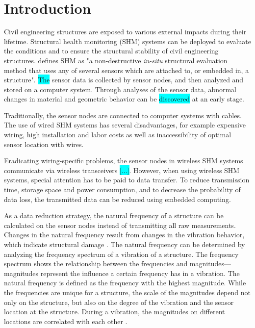 \documentclass[12pt,a4paper]{scrartcl}
\begin{document}
\section*{Introduction}

Civil engineering structures are exposed to various external impacts during their lifetime. 
Structural health monitoring (SHM) systems can be deployed to evaluate the conditions and to ensure the structural stability of civil engineering structures.
\citet{BisbySHM} defines SHM as "a non-destructive \textit{in-situ} structural evaluation method that uses any of several sensors which are attached to, or embedded in, a structure".
\colorbox{cyan}{The} sensor data is collected by sensor nodes, and then analyzed and stored on a computer system. 
Through analyses of the sensor data, abnormal changes in material and geometric behavior can be \colorbox{cyan}{discovered} at an early stage.

Traditionally, the sensor nodes are connected to computer systems with cables.
The use of wired SHM systems has several disadvantages, for example expensive wiring, high installation and labor costs as well as inaccessibility of optimal sensor location with wires.

Eradicating wiring-specific problems, the sensor nodes in wireless SHM systems communicate via wireless transceivers \colorbox{cyan}{[...]}.
However, when using wireless SHM systems, special attention has to be paid to data transfer. 
To reduce transmission time, storage space and power consumption, and to decrease the probability of data loss, the transmitted data can be reduced using embedded computing.

As a data reduction strategy, the natural frequency of a structure can be calculated on the sensor nodes instead of transmitting all raw measurements.
Changes in the natural frequency result from changes in the vibration behavior, which indicate structural damage \citep{salawu1997detection}.
The natural frequency can be determined by analyzing the frequency spectrum of a vibration of a structure.
The frequency spectrum shows the relationship between the frequencies and magnitudes---magnitudes represent the influence a certain frequency has in a vibration.
The natural frequency is defined as the frequency with the highest magnitude.
While the frequencies are unique for a structure, the scale of the magnitudes depend not only on the structure, but also on the degree of the vibration and the sensor location at the structure.
During a vibration, the magnitudes on different locations are correlated with each other \citep{rao2011fast}.
\end{document}
